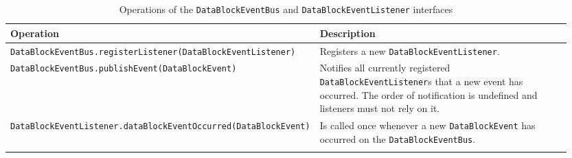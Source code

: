 \small
\begin{landscape}
\begin{longtable}{|p{0.3\linewidth}|p{0.65\linewidth}|}
\hline
\rowcolor[gray]{.9}\textbf{Operation} & \textbf{Description} \\
\endhead
\hline
\texttt{DataBlockEventBus}\linebreak\texttt{.registerListener(DataBlockEventListener)} & Registers a new \texttt{DataBlockEventListener}. \\
\hline
\texttt{DataBlockEventBus}\linebreak\texttt{.publishEvent(DataBlockEvent)} & Notifies all currently registered \texttt{DataBlockEventListener}s that a new event has occurred. The order of notification is undefined and listeners must not rely on it. \\
\hline
\texttt{DataBlockEventListener}\linebreak\texttt{.dataBlockEventOccurred(DataBlockEvent)} & Is called once whenever a new \texttt{DataBlockEvent} has occurred on the \texttt{DataBlockEventBus}. \\
\hline
\caption{Operations of the \texttt{DataBlockEventBus} and \texttt{DataBlockEventListener} interfaces}
\label{tab:DBOpsDataBlockEventBus}
\end{longtable}
\end{landscape}
\normalsize


